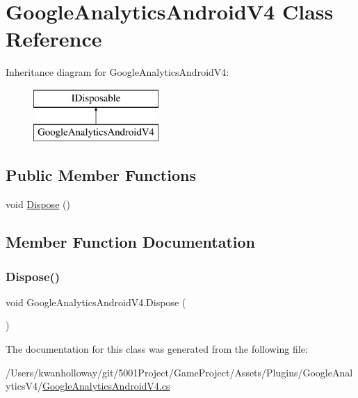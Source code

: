 \hypertarget{class_google_analytics_android_v4}{}\section{Google\+Analytics\+Android\+V4 Class Reference}
\label{class_google_analytics_android_v4}
Inheritance diagram for Google\+Analytics\+Android\+V4\+:\begin{figure}[H]
\begin{center}
\leavevmode
\includegraphics[height=2.000000cm]{class_google_analytics_android_v4}
\end{center}
\end{figure}
\subsection*{Public Member Functions}
\begin{DoxyCompactItemize}
\item 
void \hyperlink{class_google_analytics_android_v4_a71a2c9de3071401b419990f229a4bb92}{Dispose} ()
\end{DoxyCompactItemize}


\subsection{Member Function Documentation}
\mbox{\label{class_google_analytics_android_v4_a71a2c9de3071401b419990f229a4bb92}} 
\subsubsection{\texorpdfstring{Dispose()}{Dispose()}}
{\footnotesize\ttfamily void Google\+Analytics\+Android\+V4.\+Dispose (\begin{DoxyParamCaption}{ }\end{DoxyParamCaption})}



The documentation for this class was generated from the following file\+:\begin{DoxyCompactItemize}
\item 
/\+Users/kwanholloway/git/5001\+Project/\+Game\+Project/\+Assets/\+Plugins/\+Google\+Analytics\+V4/\hyperlink{_google_analytics_android_v4_8cs}{Google\+Analytics\+Android\+V4.\+cs}\end{DoxyCompactItemize}
